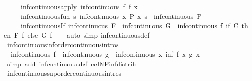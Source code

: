 \begin{isabellebody}
\ \ \ \ \ inf{\isacharunderscore}continuous{\isacharunderscore}apply{\isacharcolon}\ {\isachardoublequoteopen}inf{\isacharunderscore}continuous\ {\isacharparenleft}{\isasymlambda}f{\isachardot}\ f\ x{\isacharparenright}{\isachardoublequoteclose}\isanewline
\ \ \ \ \ inf{\isacharunderscore}continuous{\isacharunderscore}fun{\isacharcolon}\ {\isachardoublequoteopen}{\isacharparenleft}{\isasymAnd}s{\isachardot}\ inf{\isacharunderscore}continuous\ {\isacharparenleft}{\isasymlambda}x{\isachardot}\ P\ x\ s{\isacharparenright}{\isacharparenright}\ {\isasymLongrightarrow}\ inf{\isacharunderscore}continuous\ P{\isachardoublequoteclose}\isanewline
\ \ \ \ \ inf{\isacharunderscore}continuous{\isacharunderscore}If{\isacharcolon}\ {\isachardoublequoteopen}inf{\isacharunderscore}continuous\ F\ {\isasymLongrightarrow}\ inf{\isacharunderscore}continuous\ G\ {\isasymLongrightarrow}\ inf{\isacharunderscore}continuous\ {\isacharparenleft}{\isasymlambda}f{\isachardot}\ if\ C\ then\ F\ f\ else\ G\ f{\isacharparenright}{\isachardoublequoteclose}\isanewline
%
\isadelimproof
\ \ %
\endisadelimproof
%
\isatagproof
{}\isamarkupfalse%
\ {\isacharparenleft}auto\ simp{\isacharcolon}\ inf{\isacharunderscore}continuous{\isacharunderscore}def{\isacharparenright}%
\endisatagproof
{\isafoldproof}%
%
\isadelimproof
\isanewline
%
\endisadelimproof
\isanewline
{}\isamarkupfalse%
\ inf{\isacharunderscore}continuous{\isacharunderscore}inf{\isacharbrackleft}order{\isacharunderscore}continuous{\isacharunderscore}intros{\isacharbrackright}{\isacharcolon}\isanewline
\ \ {\isachardoublequoteopen}inf{\isacharunderscore}continuous\ f\ {\isasymLongrightarrow}\ inf{\isacharunderscore}continuous\ g\ {\isasymLongrightarrow}\ inf{\isacharunderscore}continuous\ {\isacharparenleft}{\isasymlambda}x{\isachardot}\ inf\ {\isacharparenleft}f\ x{\isacharparenright}\ {\isacharparenleft}g\ x{\isacharparenright}{\isacharparenright}{\isachardoublequoteclose}\isanewline
%
\isadelimproof
\ \ %
\endisadelimproof
%
\isatagproof
{}\isamarkupfalse%
\ {\isacharparenleft}simp\ add{\isacharcolon}\ inf{\isacharunderscore}continuous{\isacharunderscore}def\ ccINF{\isacharunderscore}inf{\isacharunderscore}distrib{\isacharparenright}%
\endisatagproof
{\isafoldproof}%
%
\isadelimproof
\isanewline
%
\endisadelimproof
\isanewline
{}\isamarkupfalse%
\ inf{\isacharunderscore}continuous{\isacharunderscore}sup{\isacharbrackleft}order{\isacharunderscore}continuous{\isacharunderscore}intros{\isacharbrackright}{\isacharcolon}\isanewline

\end{isabellebody}
